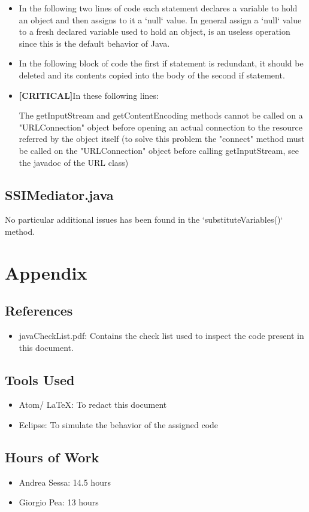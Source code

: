 \documentclass[11pt,titlepage]{article} %
\begin{document}
\begin{itemize}
\begin{itemize}
	     \item In the following two lines of code
	        each statement declares a variable to hold an object and then assigns to it a `null` value. In general assign a `null` value to a fresh declared
		variable used to hold an object, is an useless operation since this is the default behavior of Java.
		

	     \item In the following block of code
	        the first if statement is redundant, it should be deleted and its contents copied into the body of the second if statement.
		

	     \item \textbf{[CRITICAL]}In these following lines:
		
		  The getInputStream and getContentEncoding methods cannot be called on a "URLConnection" object before opening an actual connection
		  to the resource referred by the object itself (to solve this problem the "connect" method must be called on the
		  "URLConnection" object before calling getInputStream, see the javadoc of the URL class)
	    \end{itemize}
   \end{itemize}
  \subsection{SSIMediator.java}
    No particular additional issues has been found in the `substituteVariables()` method.

\newpage
\section{Appendix}
\subsection{References}
   \begin{itemize}
    \item javaCheckList.pdf: Contains the check list used to inspect the code present in this document.
   \end{itemize}
\subsection{Tools Used}
  \begin{itemize}
   \item Atom/ \LaTeX: To redact this document
   \item Eclipse: To simulate the behavior of the assigned code
  \end{itemize}
\subsection{Hours of Work}
  \begin{itemize}
   \item Andrea Sessa: 14.5 hours
   \item Giorgio Pea: 13 hours
  \end{itemize}
\end{document}
